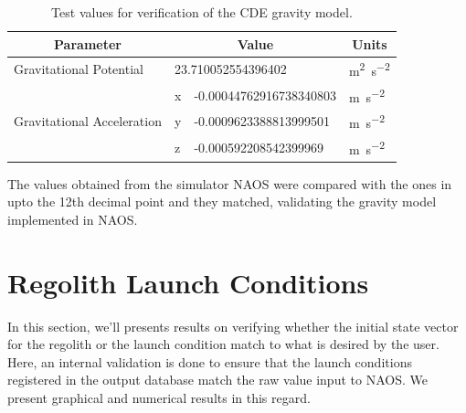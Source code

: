 \begin{table}[htb]
\centering
\captionsetup{justification=centering}
\caption{Test values for verification of the \gls{CDE} gravity model.}
\label{tab:gravity_vv_test_values}
\begin{tabular}{|l|l|l|l|}
\hline
\multicolumn{1}{|c|}{\textbf{Parameter}}    & \multicolumn{2}{c|}{\textbf{Value}}     & \multicolumn{1}{c|}{\textbf{Units}}          \\ \hline
Gravitational Potential                     & \multicolumn{2}{l|}{23.710052554396402} & \si{\metre \squared \per \second \squared} \\ \hline
\multirow{3}{*}{Gravitational Acceleration} & x       & -0.00044762916738340803       & \si{\metre \per \second \squared}          \\ \cline{2-4}
                                            & y       & -0.0009623388813999501        & \si{\metre\per \second \squared}           \\ \cline{2-4}
                                            & z       & -0.000592208542399969         & \si{\metre\per \second \squared}           \\ \hline
\end{tabular}
\end{table}
\FloatBarrier
The values obtained from the simulator \gls{NAOS} were compared with the ones in  upto the 12th decimal point and they matched, validating the gravity model implemented in \gls{NAOS}.

\section{Regolith Launch Conditions}
\label{sec:regolith_launch_conditions_vv}
In this section, we'll presents results on verifying whether the initial state vector for the regolith or the launch condition match to what is desired by the user. Here, an internal validation is done to ensure that the launch conditions registered in the output database match the raw value input to \gls{NAOS}. We present graphical and numerical results in this regard.

